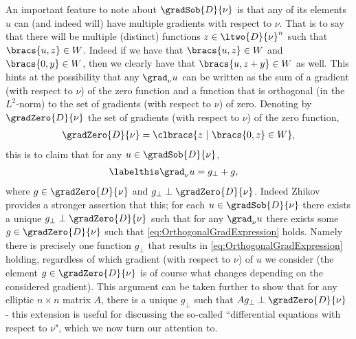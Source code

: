 An important feature to note about $\gradSob{D}{\nu}$ is that any of its elements $u$ can (and indeed will) have multiple gradients with respect to $\nu$.
That is to say that there will be multiple (distinct) functions $z\in\ltwo{D}{\nu}^n$ such that $\bracs{u,z}\in W$.
Indeed if we have that $\bracs{u,z}\in W$ and $\bracs{0,y}\in W$, then we clearly have that $\bracs{u,z+y}\in W$ as well.
This hints at the possibility that any $\grad_\nu u$ can be written as the sum of a gradient (with respect to $\nu$) of the zero function and a function that is orthogonal (in the $L^2$-norm) to the set of gradients (with respect to $\nu$) of zero.
Denoting by $\gradZero{D}{\nu}$ the set of gradients (with respect to $\nu$) of the zero function,
\begin{align*}
	\gradZero{D}{\nu} = \clbracs{z \ \vert \ \bracs{0,z}\in W},
\end{align*}
this is to claim that for any $u\in\gradSob{D}{\nu}$,
\begin{align*} \labelthis\label{eq:OrthogonalGradExpression}
	\grad_\nu u &= g_\perp + g,
\end{align*}
where $g\in\gradZero{D}{\nu}$ and $g_\perp \perp \gradZero{D}{\nu}$.
Indeed Zhikov \cite{zhikov2000extension} provides a stronger assertion that this; for each $u\in\gradSob{D}{\nu}$ there exists a unique $g_\perp \perp \gradZero{D}{\nu}$ such that for any $\grad_\nu u$ there exists some $g\in\gradZero{D}{\nu}$ such that \eqref{eq:OrthogonalGradExpression} holds.
Namely there is precisely one function $g_\perp$ that results in \eqref{eq:OrthogonalGradExpression} holding, regardless of which gradient (with respect to $\nu$) of $u$ we consider (the element $g\in\gradZero{D}{\nu}$ is of course what changes depending on the considered gradient). 
This argument can be taken further to show that for any elliptic $n\times n$ matrix $A$, there is a unique $g_\perp$ such that $Ag_\perp \perp \gradZero{D}{\nu}$ - this extension is useful for discussing the so-called ``differential equations with respect to $\nu$", which we now turn our attention to. \newline

